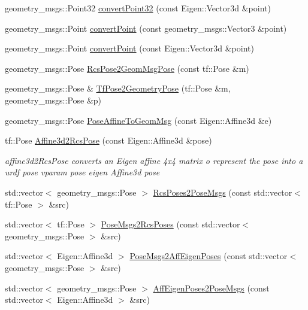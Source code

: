 \begin{DoxyCompactItemize}
geometry\-\_\-msgs\-::\-Point32 \hyperlink{namespaceConversion_a2ac86c965a5ef64c2ef739cf88cded1c}{convert\-Point32} (const Eigen\-::\-Vector3d \&point)
\item 
geometry\-\_\-msgs\-::\-Point \hyperlink{namespaceConversion_a97a7b7715282c7955405d9312ab823b7}{convert\-Point} (const geometry\-\_\-msgs\-::\-Vector3 \&point)
\item 
geometry\-\_\-msgs\-::\-Point \hyperlink{namespaceConversion_a488863a85da2273d8d756fed473c7608}{convert\-Point} (const Eigen\-::\-Vector3d \&point)
\item 
geometry\-\_\-msgs\-::\-Pose \hyperlink{namespaceConversion_ad2944cae97fd8b269f441f1e7aac0438}{Rcs\-Pose2\-Geom\-Msg\-Pose} (const tf\-::\-Pose \&m)
\item 
geometry\-\_\-msgs\-::\-Pose \& \hyperlink{namespaceConversion_ad717dde2285314fb5c3ae45fe338d287}{Tf\-Pose2\-Geometry\-Pose} (tf\-::\-Pose \&m, geometry\-\_\-msgs\-::\-Pose \&p)
\item 
geometry\-\_\-msgs\-::\-Pose \hyperlink{namespaceConversion_af336ffb14f18435ae42dd4c9f6d7a2ac}{Pose\-Affine\-To\-Geom\-Msg} (const Eigen\-::\-Affine3d \&e)
\item 
tf\-::\-Pose \hyperlink{namespaceConversion_ad39b473d79aca1cfd907f1ce8adf16b2}{Affine3d2\-Rcs\-Pose} (const Eigen\-::\-Affine3d \&pose)
\begin{DoxyCompactList}\small\item\em affine3d2\-Rcs\-Pose converts an Eigen affine 4x4 matrix o represent the pose into a urdf pose vparam pose eigen Affine3d pose \end{DoxyCompactList}\item 
std\-::vector$<$ geometry\-\_\-msgs\-::\-Pose $>$ \hyperlink{namespaceConversion_a6264c77cffdc3058ed1eecc49451b8c2}{Rcs\-Poses2\-Pose\-Msgs} (const std\-::vector$<$ tf\-::\-Pose $>$ \&src)
\item 
std\-::vector$<$ tf\-::\-Pose $>$ \hyperlink{namespaceConversion_a368ae741bbbe920e40c8ae3a53a89529}{Pose\-Msgs2\-Rcs\-Poses} (const std\-::vector$<$ geometry\-\_\-msgs\-::\-Pose $>$ \&src)
\item 
std\-::vector$<$ Eigen\-::\-Affine3d $>$ \hyperlink{namespaceConversion_a8e9c419927db9ced05f5991477a300b4}{Pose\-Msgs2\-Aff\-Eigen\-Poses} (const std\-::vector$<$ geometry\-\_\-msgs\-::\-Pose $>$ \&src)
\item 
std\-::vector$<$ geometry\-\_\-msgs\-::\-Pose $>$ \hyperlink{namespaceConversion_a92aeeb7086f6a7c9f8274f3f5a659d42}{Aff\-Eigen\-Poses2\-Pose\-Msgs} (const std\-::vector$<$ Eigen\-::\-Affine3d $>$ \&src)

\end{DoxyCompactItemize}
